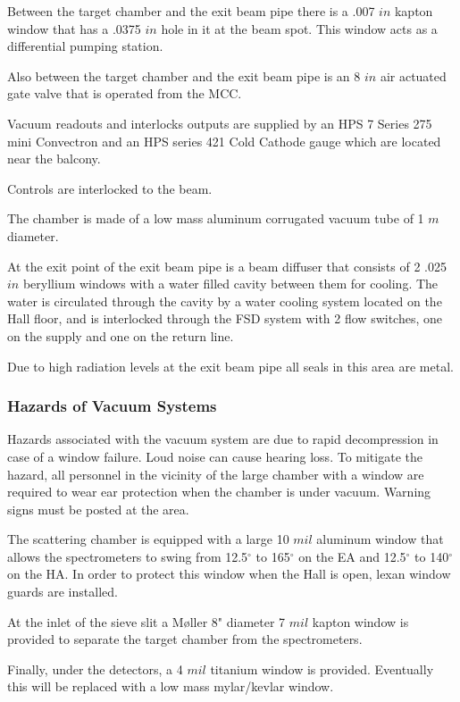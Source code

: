 Between the target chamber and the exit beam pipe there is a .007 $in$
kapton window that has a .0375 $in$ hole in it at the beam spot.  This
window acts as a differential pumping station.

Also between the target chamber and the exit beam pipe is an 8 $in$
air actuated gate valve that is operated from the MCC.

Vacuum readouts and interlocks outputs are supplied by an HPS 7 Series 
275 mini Convectron and an HPS series 421 Cold Cathode gauge
which are located near the balcony.

Controls are interlocked to the beam.

The chamber is made of a low mass aluminum corrugated vacuum tube of 1 
$m$ diameter.

At the exit point of the exit beam pipe is a beam diffuser that
consists of 2 .025 $in$ beryllium windows with a water filled cavity between
them for cooling.  The water is circulated through the cavity by a
water cooling system located on the Hall floor, and is interlocked
through the FSD system with 2 flow switches, one on the supply and
one on the return line.

Due to high radiation levels at the exit beam pipe all seals in
this area are metal.

\subsubsection{Hazards of Vacuum Systems}

Hazards associated with the vacuum system are due to rapid 
decompression in case of a window failure. Loud noise can cause hearing
loss.  To mitigate the hazard, all personnel in the vicinity of the 
large chamber with a window are required to wear ear protection when
the chamber is under vacuum. Warning signs must be posted at the area.

The scattering chamber is equipped with a large 10 $mil$ aluminum window that 
allows the spectrometers to swing from 12.5$^{\circ}$ to 165$^{\circ}$ 
on the EA and 12.5$^{\circ}$ to 140$^{\circ}$ on the HA. In order to
protect this window when the Hall is open, lexan window guards are
installed.

At the inlet of the sieve slit a M{\o}ller 8" diameter 7 $mil$ kapton window 
is provided to separate the target chamber from the spectrometers.

Finally, under the detectors, a 4 $mil$ titanium window is provided.  
Eventually this will be replaced with a low mass mylar/kevlar window.

